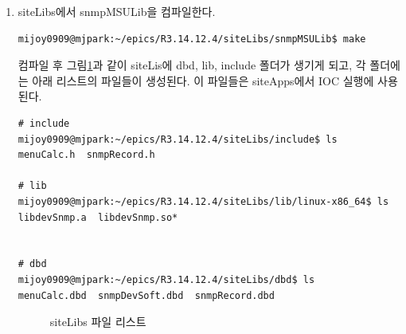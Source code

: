 \documentclass[11pt
  , a4paper
  , article
  , oneside
]{memoir}
\begin{document}
\begin{enumerate}
\item siteLibs에서 snmpMSULib을 컴파일한다.

\begin{lstlisting}[style=termstyle]
mijoy0909@mjpark:~/epics/R3.14.12.4/siteLibs/snmpMSULib$ make
\end{lstlisting}

컴파일 후 그림\ref{fig:libmake}과 같이 siteLis에 dbd, lib, include 폴더가 생기게 되고, 각 폴더에는 아래 리스트의 파일들이 생성된다. 이 파일들은 siteApps에서 IOC 실행에 사용된다.

\begin{lstlisting}[style=termstyle]
# include
mijoy0909@mjpark:~/epics/R3.14.12.4/siteLibs/include$ ls
menuCalc.h  snmpRecord.h

# lib
mijoy0909@mjpark:~/epics/R3.14.12.4/siteLibs/lib/linux-x86_64$ ls
libdevSnmp.a  libdevSnmp.so*


# dbd
mijoy0909@mjpark:~/epics/R3.14.12.4/siteLibs/dbd$ ls
menuCalc.dbd  snmpDevSoft.dbd  snmpRecord.dbd
\end{lstlisting}

\begin{figure}[!h]
  \centering
              \hfill
              \hfill
            
  \caption
      {
        siteLibs 파일 리스트 
      }
 \label{fig:libmake}
\end{figure}


\end{enumerate}
\end{document}
